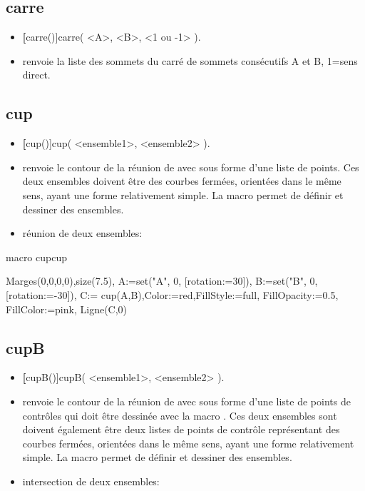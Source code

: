 \subsection{carre}
\begin{itemize}
 \item \util \textbf[carre()]{carre( <A>, <B>, <1 ou -1> )}.
 \item \desc renvoie la liste des sommets du carré de sommets consécutifs A et B, 1=sens direct.
\end{itemize}

\subsection{cup}
\begin{itemize}
 \item \util \textbf[cup()]{cup( <ensemble1>, <ensemble2> )}.
 \item \desc renvoie le contour de la réunion de  avec  sous forme d'une liste de points. Ces deux ensembles doivent être des courbes fermées, orientées dans le même sens, ayant une forme relativement simple. La macro  permet de définir et dessiner des ensembles.
 \item \exem réunion de deux ensembles:
\end{itemize}

\begin{demo}{macro cup}{cup}
\begin{texgraph}[name=cup]
Marges(0,0,0,0),size(7.5),
A:=set("A", 0, [rotation:=30]), 
B:=set("B", 0, [rotation:=-30]),
C:= cup(A,B),Color:=red,FillStyle:=full, 
FillOpacity:=0.5, FillColor:=pink,
Ligne(C,0)
\end{texgraph}
\end{demo}

\subsection{cupB}\label{maccupB}
\begin{itemize}
 \item \util \textbf[cupB()]{cupB( <ensemble1>, <ensemble2> )}.
 \item \desc renvoie le contour de la réunion de  avec  sous forme d'une liste de points de contrôles qui doit être dessinée avec la macro . Ces deux ensembles sont doivent également être deux listes de points de contrôle représentant des courbes fermées, orientées dans le même sens, ayant une forme relativement simple. La macro  permet de définir et dessiner des ensembles.
 \item \exem intersection de deux ensembles:
\end{itemize}

